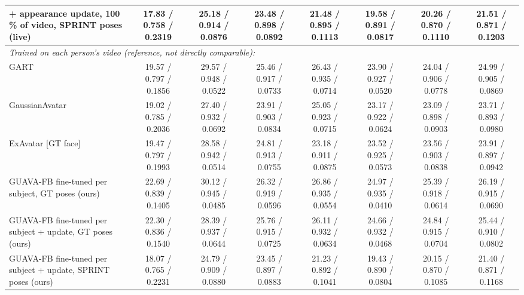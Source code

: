 \begin{tabular}{lccccccc}
+ appearance update, 100 \% of video, SPRINT poses (live) & 17.83 / 0.758 / 0.2319 & 25.18 / 0.914 / 0.0876 & 23.48 / 0.898 / 0.0892 & 21.48 / 0.895 / 0.1113 & 19.58 / 0.891 / 0.0817 & 20.26 / 0.870 / 0.1110 & 21.51 / 0.871 / 0.1203 \\
\midrule
\multicolumn{8}{l}{\textit{Trained on each person's video (reference, not directly comparable):}} \\
GART & 19.57 / 0.797 / 0.1856 & 29.57 / 0.948 / 0.0522 & 25.46 / 0.917 / 0.0733 & 26.43 / 0.935 / 0.0714 & 23.90 / 0.927 / 0.0520 & 24.04 / 0.906 / 0.0778 & 24.99 / 0.905 / 0.0869 \\
GaussianAvatar & 19.02 / 0.785 / 0.2036 & 27.40 / 0.932 / 0.0692 & 23.91 / 0.903 / 0.0834 & 25.05 / 0.923 / 0.0715 & 23.17 / 0.922 / 0.0624 & 23.09 / 0.898 / 0.0903 & 23.71 / 0.893 / 0.0980 \\
ExAvatar [GT face] & 19.47 / 0.797 / 0.1993 & 28.58 / 0.942 / 0.0514 & 24.81 / 0.913 / 0.0755 & 23.18 / 0.911 / 0.0875 & 23.52 / 0.925 / 0.0573 & 23.56 / 0.903 / 0.0838 & 23.91 / 0.897 / 0.0942 \\
GUAVA-FB fine-tuned per subject, GT poses (ours) & 22.69 / 0.839 / 0.1405 & 30.12 / 0.945 / 0.0485 & 26.32 / 0.919 / 0.0596 & 26.86 / 0.935 / 0.0554 & 24.97 / 0.935 / 0.0410 & 25.39 / 0.918 / 0.0614 & 26.19 / 0.915 / 0.0690 \\
GUAVA-FB fine-tuned per subject + update, GT poses (ours) & 22.30 / 0.836 / 0.1540 & 28.39 / 0.937 / 0.0644 & 25.76 / 0.915 / 0.0725 & 26.11 / 0.932 / 0.0634 & 24.66 / 0.932 / 0.0468 & 24.84 / 0.915 / 0.0704 & 25.44 / 0.910 / 0.0802 \\
GUAVA-FB fine-tuned per subject + update, SPRINT poses (ours) & 18.07 / 0.765 / 0.2231 & 24.79 / 0.909 / 0.0880 & 23.45 / 0.897 / 0.0883 & 21.23 / 0.892 / 0.1041 & 19.43 / 0.890 / 0.0804 & 20.15 / 0.870 / 0.1085 & 21.40 / 0.871 / 0.1168 \\
\bottomrule
\end{tabular}
